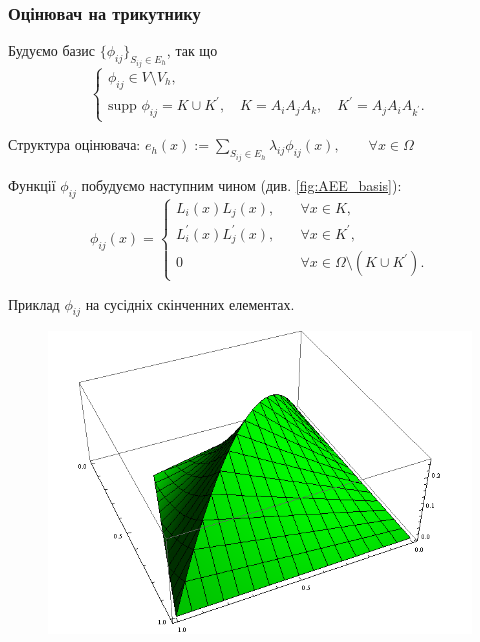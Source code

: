 
\begin{frame}[allowframebreaks]
	\frametitle<presentation>{Оцінювач на трикутнику}

	Будуємо базис $\lbrace \phi_{ij} \rbrace_{S_{ij} \in E_h}$, так що
%
	\begin{equation}\label{eq:basis_properties}
		\begin{cases}
			\phi_{ij} \in V \setminus V_h, \\
			\text{supp } \phi_{ij} = K \cup K^\prime, \quad K = A_iA_jA_k, \quad K^\prime = A_jA_iA_{k^\prime}.
		\end{cases}
	\end{equation}

		Структура оцінювача:
		$e_h(x) := \sum \limits_{S_{ij} \in E_h} \lambda_{ij} \phi_{ij}(x), \qquad \forall x \in \Omega$

		Функції $\phi_{ij}$ побудуємо наступним чином (див. \autoref{fig:AEE_basis}):
		\begin{equation}
			\phi_{ij}(x) =
			\begin{cases}
				L_i(x)L_j(x), &\quad \forall x \in K ,\\
				L_i^\prime(x)L_j^\prime(x), &\quad \forall x \in K^\prime ,\\
				0 &\quad \forall x \in \Omega \setminus (K \cup K^\prime).
			\end{cases}
		\end{equation}

\end{frame}

\begin{frame}{Приклад $\phi_{ij}$ на сусідніх скінченних елементах.}

		\begin{figure}[H]
			\centering
		    \includegraphics[scale=0.4]{images/basis}
		    \label{fig:AEE_basis}
		\end{figure}

\end{frame}

